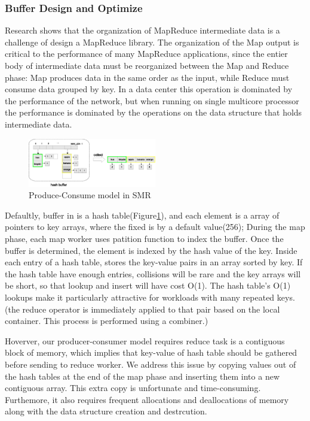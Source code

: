 \subsubsection{Buffer Design and Optimize}
Research shows that the organization of MapReduce
intermediate data is a challenge of design a  MapReduce library.
The organization of the Map output is critical to the
performance of many MapReduce applications, 
since the entier body of intermediate data must be
reorganized between the Map and Reduce phase:
Map produces data in the same order as the input,
while Reduce must consume data grouped by key.\cite{mao2010metis}
In a data center this operation is dominated by
the performance of the network, but when running 
on single multicore processor the performance
is dominated by the operations on the data structure
that holds intermediate data.

\begin{figure}[!h!t]  
    \centering
    \includegraphics[width=0.5\textwidth]{eps/dmr_hash_buffer.eps}
    \caption{Produce-Consume model in SMR}
    \label{fig:dmr:hash-buffer}
\end{figure}
Defaultly, buffer in \myds is a hash table(Figure\ref{fig:dmr:hash-buffer}), 
and each element is a array of pointers to key arrays,
where the fixed is by a default value(256);
During the map phase, each map worker uses patition function
to index the buffer.
Once the buffer is determined, 
the element is indexed by the hash value of the key.
Inside each entry of a hash table,
\myds stores the key-value pairs in an array sorted by key.
If the hash table have enough entries, 
collisions will be rare and the key arrays will be short,
so that lookup and insert will have cost O(1).
The hash table's O(1) lookups 
make it particularly attractive for workloads with many repeated keys.
{\color{gray}(the reduce operator is immediately applied
to that pair based on the local container. This process is
performed using a combiner.)}

Hoverver, our producer-consumer model requires
reduce task is a contiguous block of memory, 
which implies that key-value of hash table should be gathered
before sending to reduce worker.
We address this issue by 
copying values out of the hash tables
at the end of the map phase and 
inserting them into a new contiguous array.
This extra copy is unfortunate and time-consuming.
Furthemore, it also requires frequent allocations and deallocations of memory 
along with the data structure creation and destrcution.

